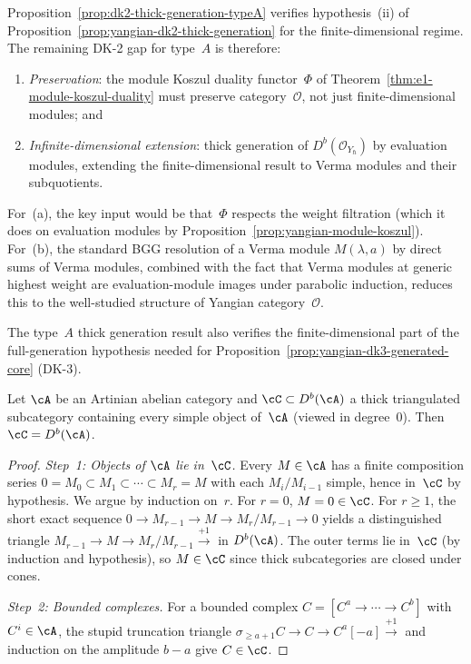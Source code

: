 \begin{remark}
\label{rem:dk2-thick-generation-consequence}
Proposition~\ref{prop:dk2-thick-generation-typeA} verifies
hypothesis~(ii) of Proposition~\ref{prop:yangian-dk2-thick-generation}
for the finite-dimensional regime.  The remaining DK-2 gap for
type~$A$ is therefore:
\begin{enumerate}[label=\textup{(\alph*)}]
\item \emph{Preservation}: the module Koszul duality functor~$\Phi$
  of Theorem~\ref{thm:e1-module-koszul-duality} must preserve
  category~$\mathcal{O}$, not just finite-dimensional modules; and
\item \emph{Infinite-dimensional extension}: thick generation of
  $D^b(\mathcal{O}_{Y_\hbar})$ by evaluation modules, extending
  the finite-dimensional result to Verma modules and their
  subquotients.
\end{enumerate}
For~(a), the key input would be that~$\Phi$ respects the weight
filtration (which it does on evaluation modules by
Proposition~\ref{prop:yangian-module-koszul}).  For~(b), the standard
BGG resolution of a Verma module $M(\lambda, a)$ by direct sums of
Verma modules, combined with the fact that Verma modules at generic
highest weight are evaluation-module images under parabolic induction,
reduces this to the well-studied structure of Yangian
category~$\mathcal{O}$.

The type~$A$ thick generation result also
verifies the finite-dimensional part of the full-generation
hypothesis needed for
Proposition~\ref{prop:yangian-dk3-generated-core} \textup{(}DK-3\textup{)}.
\end{remark}

\begin{lemma}
\label{lem:composition-thick-generation}
Let $\cA$ be an Artinian abelian category and
$\cC \subset D^b(\cA)$ a thick triangulated subcategory containing
every simple object of~$\cA$ (viewed in degree~$0$).  Then
$\cC = D^b(\cA)$.
\end{lemma}

\begin{proof}
\emph{Step~1: Objects of $\cA$ lie in~$\cC$.}
Every $M \in \cA$ has a finite composition series
$0 = M_0 \subset M_1 \subset \cdots \subset M_r = M$
with each $M_i/M_{i-1}$ simple, hence in~$\cC$ by hypothesis.
We argue by induction on~$r$.  For $r = 0$, $M = 0 \in \cC$.
For $r \ge 1$, the short exact sequence
$0 \to M_{r-1} \to M \to M_r/M_{r-1} \to 0$
yields a distinguished triangle
$M_{r-1} \to M \to M_r/M_{r-1} \xrightarrow{+1}$
in $D^b(\cA)$.
The outer terms lie in~$\cC$ (by induction and hypothesis),
so $M \in \cC$ since thick subcategories are closed under cones.

\emph{Step~2: Bounded complexes.}
For a bounded complex $C = [C^a \to \cdots \to C^b]$ with
$C^i \in \cA$, the stupid truncation triangle
$\sigma_{\ge a+1}C \to C \to C^a[-a] \xrightarrow{+1}$
and induction on the amplitude $b - a$ give $C \in \cC$.
\end{proof}

